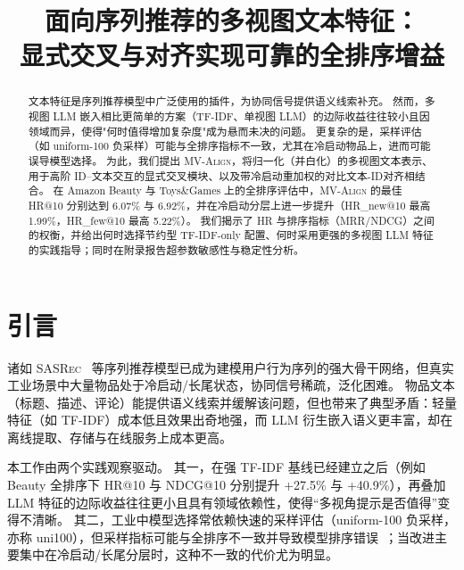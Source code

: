 \documentclass[sigconf,natbib=true]{acmart}
\newcommand{\model}{\textsc{MV-Align}\xspace}
\newcommand{\base}{\textsc{SASRec}\xspace}
\newcommand{\tfidf}{\textsc{TF-IDF}\xspace}
\newcommand{\llm}{\textsc{LLM}\xspace}
\begin{document}
\title{面向序列推荐的多视图文本特征：\\
显式交叉与对齐实现可靠的全排序增益}


\begin{abstract}
文本特征是序列推荐模型中广泛使用的插件，为协同信号提供语义线索补充。
然而，多视图 \llm 嵌入相比更简单的方案（\tfidf、单视图 \llm）的边际收益往往较小且因领域而异，使得"何时值得增加复杂度"成为悬而未决的问题。
更复杂的是，采样评估（如 uniform-100 负采样）可能与全排序指标不一致，尤其在冷启动物品上，进而可能误导模型选择。
为此，我们提出 \model，将归一化（并白化）的多视图文本表示、用于高阶 ID--文本交互的显式交叉模块、以及带冷启动重加权的对比文本-ID对齐相结合。
在 Amazon Beauty 与 Toys\&Games 上的全排序评估中，\model 的最佳 HR@10 分别达到 6.07\% 与 6.92\%，并在冷启动分层上进一步提升（HR\_new@10 最高 1.99\%，HR\_few@10 最高 5.22\%）。
我们揭示了 HR 与排序指标（MRR/NDCG）之间的权衡，并给出何时选择节约型 \tfidf-only 配置、何时采用更强的多视图 \llm 特征的实践指导；同时在附录报告超参数敏感性与稳定性分析。
\end{abstract}


\maketitle

\section{引言}

诸如 \base~\cite{kang2018sasrec} 等序列推荐模型已成为建模用户行为序列的强大骨干网络，但真实工业场景中大量物品处于冷启动/长尾状态，协同信号稀疏，泛化困难。
物品文本（标题、描述、评论）能提供语义线索并缓解该问题，但也带来了典型矛盾：轻量特征（如 \tfidf）成本低且效果出奇地强，而 \llm 衍生嵌入语义更丰富，却在离线提取、存储与在线服务上成本更高。

本工作由两个实践观察驱动。
其一，在强 \tfidf 基线已经建立之后（例如 Beauty 全排序下 HR@10 与 NDCG@10 分别提升 +27.5\% 与 +40.9\%），再叠加 \llm 特征的边际收益往往更小且具有领域依赖性，使得“多视角提示是否值得”变得不清晰。
其二，工业中模型选择常依赖快速的采样评估（uniform-100 负采样，亦称 uni100），但采样指标可能与全排序不一致并导致模型排序错误~\cite{krichene2020sampledmetrics}；当改进主要集中在冷启动/长尾分层时，这种不一致的代价尤为明显。
\end{document}
